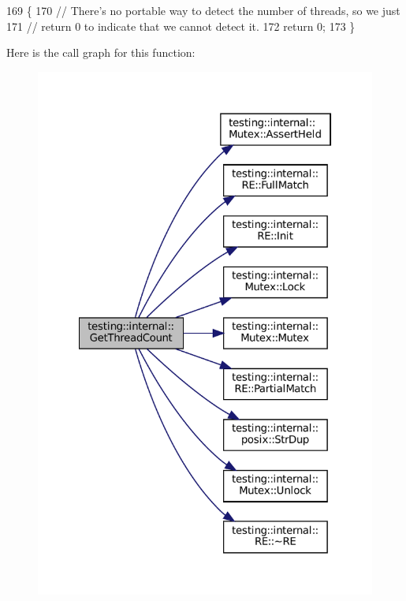 \begin{DoxyCode}
169                         \{
170   \textcolor{comment}{// There's no portable way to detect the number of threads, so we just}
171   \textcolor{comment}{// return 0 to indicate that we cannot detect it.}
172   \textcolor{keywordflow}{return} 0;
173 \}
\end{DoxyCode}
Here is the call graph for this function\+:
\nopagebreak
\begin{figure}[H]
\begin{center}
\leavevmode
\includegraphics[width=322pt]{namespacetesting_1_1internal_a3b9b3649cd04558bf46c75de52a7ef34_cgraph}
\end{center}
\end{figure}
\mbox{\label{namespacetesting_1_1internal_ae66b46943a429e6efb1db456d4cae90c}} 
